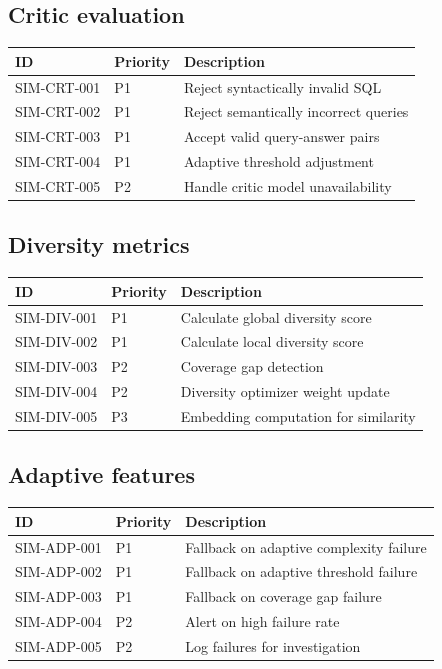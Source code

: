 \documentclass[12pt,a4paper,twoside]{report}
\begin{document}
\subsection{Critic evaluation}

\begin{tabularx}{\linewidth}{@{}l l X@{}}
\toprule
\textbf{ID} & \textbf{Priority} & \textbf{Description} \\ \midrule
SIM-CRT-001 & P1 & Reject syntactically invalid SQL \\
SIM-CRT-002 & P1 & Reject semantically incorrect queries \\
SIM-CRT-003 & P1 & Accept valid query-answer pairs \\
SIM-CRT-004 & P1 & Adaptive threshold adjustment \\
SIM-CRT-005 & P2 & Handle critic model unavailability \\
\bottomrule
\end{tabularx}

\subsection{Diversity metrics}

\begin{tabularx}{\linewidth}{@{}l l X@{}}
\toprule
\textbf{ID} & \textbf{Priority} & \textbf{Description} \\ \midrule
SIM-DIV-001 & P1 & Calculate global diversity score \\
SIM-DIV-002 & P1 & Calculate local diversity score \\
SIM-DIV-003 & P2 & Coverage gap detection \\
SIM-DIV-004 & P2 & Diversity optimizer weight update \\
SIM-DIV-005 & P3 & Embedding computation for similarity \\
\bottomrule
\end{tabularx}

\subsection{Adaptive features}

\begin{tabularx}{\linewidth}{@{}l l X@{}}
\toprule
\textbf{ID} & \textbf{Priority} & \textbf{Description} \\ \midrule
SIM-ADP-001 & P1 & Fallback on adaptive complexity failure \\
SIM-ADP-002 & P1 & Fallback on adaptive threshold failure \\
SIM-ADP-003 & P1 & Fallback on coverage gap failure \\
SIM-ADP-004 & P2 & Alert on high failure rate \\
SIM-ADP-005 & P2 & Log failures for investigation \\
\bottomrule
\end{tabularx}
\end{document}
